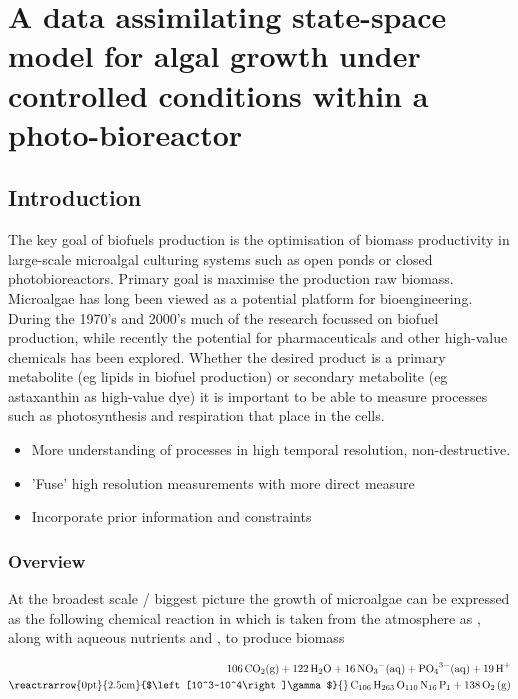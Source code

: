 \documentclass{ruthesis}
\begin{document}
\tableofcontents


\setcounter{chapter}{3}
\chapter{A data assimilating state-space model for algal growth under controlled conditions within a photo-bioreactor}\label{ch:micro_chapter}


\section{Introduction}\label{sec:micro_intro} 

The key goal of biofuels production is the optimisation of biomass productivity in large-scale microalgal culturing systems such as open ponds or closed photobioreactors. Primary goal is maximise the production raw biomass.  
Microalgae has long been viewed as a potential platform for bioengineering.  During the 1970's and 2000's much of the research focussed on biofuel production, while recently the potential for pharmaceuticals and other high-value chemicals has been explored.  Whether the desired product is a primary metabolite (eg lipids in biofuel production) or secondary metabolite (eg astaxanthin as high-value dye) it is important to be able to measure processes such as photosynthesis and respiration that place in the cells.  


\begin{itemize}
\item{} More understanding of processes in high temporal resolution, non-destructive.  
\item{} 'Fuse' high resolution measurements with more direct measure 
\item{} Incorporate prior information and constraints 
\end{itemize}





\subsection{Overview} 
At the broadest scale / biggest picture the growth of microalgae can be expressed as the following chemical reaction in which  is taken from the atmosphere as , along with aqueous nutrients  and , to produce biomass

\begin{align*}\label{eq:chem_simple}
\ce{
 106 CO_2(g)  + 122 H_2O  + 16  NO_3^-(aq)  + PO_4^{3-}(aq)  + 19 H^+}\nonumber\\
 \ce{
  \reactrarrow{0pt}{2.5cm}{$\left[10^3-10^4\right]\gamma$}{} C_{106} H_{263} O_{110} N_{16} P_1 + 138 O_2 (g)}\\ 
\end{align*}%
\end{document}
